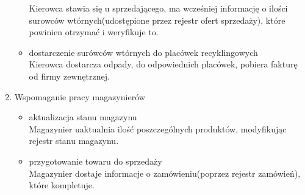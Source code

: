 \begin{enumerate}
\begin{itemize}
		Kierowca stawia się u sprzedającego, ma wcześniej informację o ilości surowców wtórnych(udostępione przez rejestr ofert sprzedaży), które powinien otrzymać i weryfikuje to.
		\item dostarczenie surówców wtórnych do placówek recyklingowych \\ 
		Kierowca dostarcza odpady, do odpowiednich placówek, pobiera fakturę od firmy zewnętrznej.
		\end{itemize}
	\item Wspomaganie pracy magazynierów
		\begin{itemize}
		\item aktualizacja stanu magazynu \\
	 	Magazynier uaktualnia ilość poszczególnych produktów, modyfikując rejestr stanu magazynu.
	 	\item przygotowanie towaru do sprzedaży \\
	 	Magazynier dostaje informacje o zamówieniu(poprzez rejestr zamówień), które kompletuje.
		\end{itemize}
\end{enumerate}